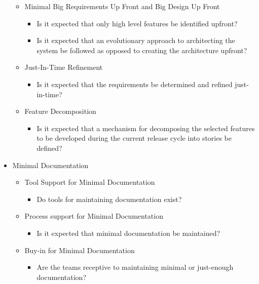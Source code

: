\begin{appendices}
\begin{itemize}
		\begin{itemize}
			\item Minimal Big Requirements Up Front and Big Design Up Front
				\begin{itemize}
					\item Is it expected that only high level features be identified upfront?
					\item Is it expected that an evolutionary approach to architecting the system be followed as opposed to creating the architecture upfront?
				\end{itemize}
			\item Just-In-Time Refinement
				\begin{itemize}
					\item Is it expected that the requirements be determined and refined just-in-time?
				\end{itemize}
			\item Feature Decomposition
				\begin{itemize}
					\item Is it expected that a mechanism for decomposing the selected features to be developed during the current release cycle into stories be defined?
				\end{itemize}
		\end{itemize}
	\item Minimal Documentation
		\begin{itemize}
			\item Tool Support for Minimal Documentation
				\begin{itemize}
					\item Do tools for maintaining documentation exist?
				\end{itemize}
			\item Process support for Minimal Documentation
				\begin{itemize}
					\item Is it expected that minimal documentation be maintained?
				\end{itemize}
			\item Buy-in for Minimal Documentation
				\begin{itemize}
					\item Are the teams receptive to maintaining minimal or just-enough documentation?
				\end{itemize}
		\end{itemize}
\end{itemize}






\end{appendices}

